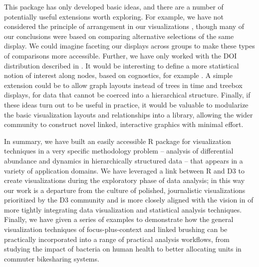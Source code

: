 \documentclass[12pt]{article}
\begin{document}
This package has only developed basic ideas, and there are a number of
potentially useful extensions worth exploring. For example, we have not
considered the principle of arrangement in our visualizations
\citep{buja1996interactive}, though many of our conclusions were based on
comparing alternative selections of the same display. We could imagine faceting
our displays across groups to make these types of comparisons more accessible.
Further, we have only worked with the DOI distribution described in
\citep{heer2004doitrees}. It would be interesting to define a more statistical
notion of interest along nodes, based on cognostics, for example
\citep{hafen2013trelliscope, friedman2002john}. A simple extension could be to
allow graph layouts instead of trees in time and treebox displays, for data that
cannot be coerced into a hierarchical structure. Finally, if these ideas turn
out to be useful in practice, it would be valuable to modularize the basic
visualization layouts and relationships into a library, allowing the wider
community to construct novel linked, interactive graphics with minimal effort.

In summary, we have built an easily accessible R package for visualization
techniques in a very specific methodology problem -- analysis of differential
abundance and dynamics in hierarchically structured data -- that appears in a
variety of application domains. We have leveraged a link between R and D3
\citep{vaidyanathan2014htmlwidgets} to create visualizations during the
exploratory phase of data analysis; in this way our work is a departure from the
culture of polished, journalistic visualizations prioritized by the D3 community
and is more closely aligned with the vision in \citep{de2003visual} of more
tightly integrating data visualization and statistical analysis techniques.
Finally, we have given a series of examples to demonstrate how the general
visualization techniques of focus-plus-context and linked brushing can be
practically incorporated into a range of practical analysis workflows, from
studying the impact of bacteria on human health to better allocating units in
commuter bikesharing systems.



\end{document}
